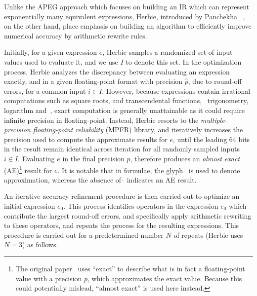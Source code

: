 Unlike the APEG approach which focuses on building an IR which can
represent exponentially many equivalent expressions, Herbie, introduced by
Panchekha \etal~\cite{panchekha15}, on the other hand, place emphasis on
building an algorithm to efficiently improve numerical accuracy by arithmetic
rewrite rules.

Initially, for a given expression $e$, Herbie samples a randomized set of
input values used to evaluate it, and we use $I$ to denote this set.  In the
optimization process, Herbie analyzes the discrepancy between evaluating
an expression exactly, and in a given floating-point format with precision
$\hat{p}$, due to round-off errors, for a common input $i \in I$.  However,
because expressions contain irrational computations such as square roots,
and transcendental functions, \eg~trigonometry, logarithm and~\etc, exact
computation is generally unattainable as it could require infinite precision
in floating-point.  Instead, Herbie resorts to the \emph{multiple-precision
floating-point reliability} (MPFR) library, and iteratively increases the
precision used to compute the approximate results for $e$, until the leading
64 bits in the result remain identical across iteration for all randomly
sampled inputs $i \in I$.  Evaluating $e$ in the final precision $p$, therefore
produces an \emph{almost exact} (AE)\footnote{%
    The original paper~\cite{panchekha15} uses ``exact'' to describe what is in
    fact a floating-point value with a precision $p$, which approximates the
    exact value.  Because this could potentially mislead, ``almost exact'' is
    used here instead.
}
result for $e$.  It is notable that in formulae, the glyph $\hat{\,}$ is used
to denote approximation, whereas the absence of $\hat{\,}$ indicates an AE
result.

An iterative accuracy refinement procedure is then carried out to optimize an
initial expression $e_0$.  This process identifies operators in the expression
$e_0$ which contribute the largest round-off errors, and specifically apply
arithmetic rewriting to these operators, and repeats the process for the
resulting expressions.  This procedure is carried out for a predetermined
number $N$ of repeats (Herbie uses $N = 3$) as follows.

